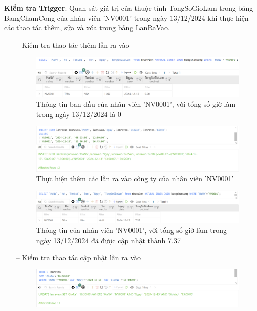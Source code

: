 \newpage
\textbf{Kiểm tra Trigger}: Quan sát giá trị của thuộc tính TongSoGioLam trong bảng BangChamCong của nhân viên 'NV0001' trong ngày 13/12/2024 khi thực hiện các thao tác thêm, sửa và xóa trong bảng LanRaVao.
\begin{itemize}
    \item [--] Kiểm tra thao tác thêm lần ra vào
    \begin{figure}[H]
        \centering
        \includegraphics[width=\linewidth]{content/images/trigger_2_1.png}
        \caption{Thông tin ban đầu của nhân viên 'NV0001', với tổng số giờ làm trong ngày 13/12/2024 là 0}
        \label{fig:trigger_2_1}
    \end{figure}
    \begin{figure}[H]
        \centering
        \includegraphics[width=\linewidth]{content/images/trigger_2_2.png}
        \caption{Thực hiện thêm các lần ra vào công ty của nhân viên 'NV0001'}
        \label{fig:trigger_2_2}
    \end{figure}
    \begin{figure}[H]
        \centering
        \includegraphics[width=\linewidth]{content/images/trigger_2_3.png}
        \caption{Thông tin của nhân viên 'NV0001', với tổng số giờ làm trong ngày 13/12/2024 đã được cập nhật thành 7.37}
        \label{fig:trigger_2_3}
    \end{figure}
    \item [--] Kiểm tra thao tác cập nhật lần ra vào
    \begin{figure}[H]
        \centering
        \includegraphics[width=\linewidth]{content/images/trigger_2_4.png}

\end{figure}
\end{itemize}
